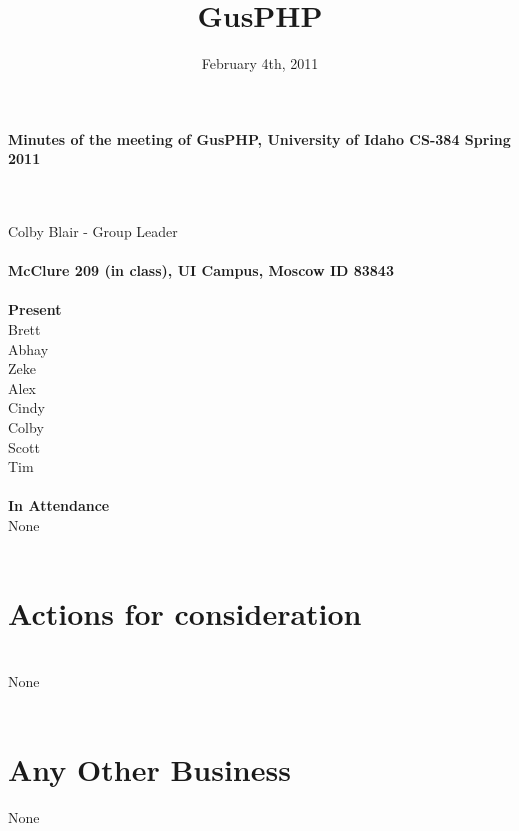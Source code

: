 \documentclass[12pt]{article}
\title{GusPHP}
\date{February 4th, 2011}
\begin{document}
\maketitle
\begin{center}\textbf{Minutes of the meeting of GusPHP, University of Idaho CS-384 Spring 2011} \end{center} \\ 
\\
Colby Blair - Group Leader\\ 
\\
\textbf{McClure 209 (in class), UI Campus, Moscow ID 83843} \\ 
\\
\textbf{Present}\\ 
Brett\\
Abhay\\
Zeke\\
Alex\\
Cindy\\
Colby\\
Scott\\
Tim\\
\\
\textbf{In Attendance}\\
None \\
\\
\section{Actions for consideration} \\
None \\
\\
\section{Any Other Business}
None \\
\\
\end{document}

